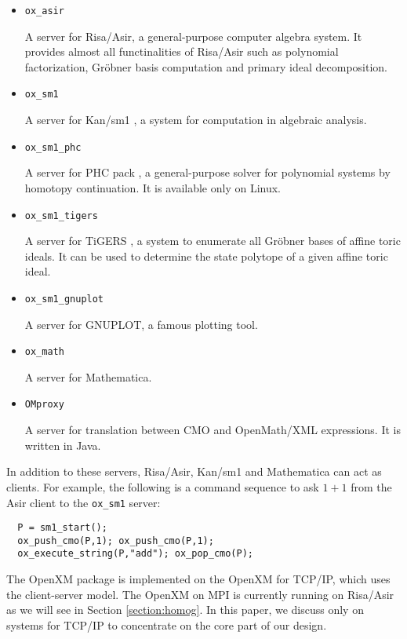 \begin{itemize}
\item {\tt ox\_asir}

A server for Risa/Asir, a general-purpose computer algebra
system. It provides almost
all functinalities of Risa/Asir such as polynomial factorization,
Gr\"obner basis computation and primary ideal decomposition.
\item {\tt ox\_sm1}

A server for Kan/sm1 \cite{kan}, a system for computation in algebraic
analysis. 

\item {\tt ox\_sm1\_phc}

A server for PHC pack \cite{phc}, a general-purpose solver for
polynomial systems by homotopy continuation. It is available only
on Linux.

\item {\tt ox\_sm1\_tigers}

A server for TiGERS \cite{tigers}, a system to enumerate
all Gr\"obner bases of affine toric ideals.
It can be used to determine the state polytope
of a given affine toric ideal.

\item {\tt ox\_sm1\_gnuplot}

A server for GNUPLOT, a famous plotting tool.
\item {\tt ox\_math}

A server for Mathematica.

\item {\tt OMproxy}

A server for translation between CMO and OpenMath/XML expressions.
It is written in Java.
\end{itemize}
In addition to these servers, Risa/Asir, Kan/sm1 and Mathematica
can act as clients. 
For example, the following is a command sequence to ask $1+1$ from
the Asir client to the {\tt ox\_sm1} server:
\begin{verbatim}
  P = sm1_start();
  ox_push_cmo(P,1); ox_push_cmo(P,1);
  ox_execute_string(P,"add"); ox_pop_cmo(P);
\end{verbatim}
The OpenXM package is implemented on the  OpenXM for TCP/IP, 
which uses the client-server model.
The OpenXM on MPI \cite{MPI} is currently running on Risa/Asir
as we will see in Section \ref{section:homog}.
In this paper, we discuss only on systems for TCP/IP
to concentrate on the core part of our design.






